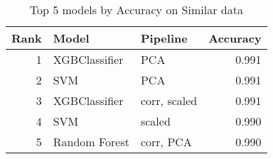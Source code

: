 \begin{table}[!htb]
\caption{Top 5 models by Accuracy on Similar data}
\label{table-top-5-accuracy-similar}
\centering
\begin{tabular}{rllr}
\toprule
Rank & Model & Pipeline & Accuracy \\
\midrule
1 & XGBClassifier & PCA & 0.991 \\
2 & SVM & PCA & 0.991 \\
3 & XGBClassifier & corr, scaled & 0.991 \\
4 & SVM & scaled & 0.990 \\
5 & Random Forest & corr, PCA & 0.990 \\
\bottomrule
\end{tabular}
\end{table}

